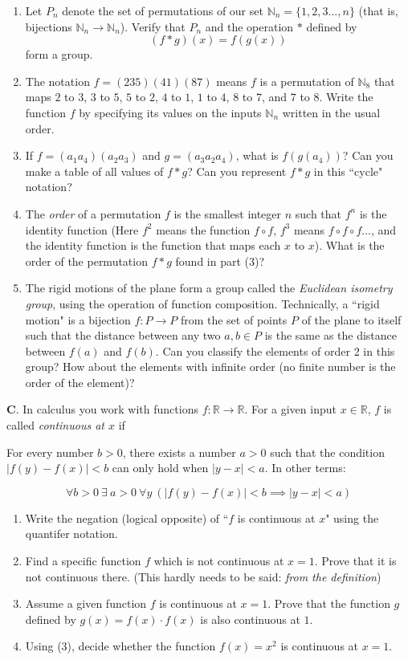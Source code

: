\documentclass[12pt]{article}
\begin{document}
\begin{enumerate}
\item{Let $P_n$ denote the set of permutations of our set $\mathbb{N}_n=\{1,2,3...,n\}$ (that is, bijections $\mathbb{N}_n\rightarrow\mathbb{N}_n$).  Verify that $P_n$ and the operation $*$ defined by 
\[(f*g)(x)=f(g(x))\]
form a group.
}
\item{The notation $f=(235)(41)(87)$ means $f$ is a permutation of $\mathbb{N}_8$ that maps $2$ to $3$, $3$ to $5$, $5$ to $2$, $4$ to $1$, $1$ to $4$, $8$ to $7$, and $7$ to $8$.  Write the function $f$ by specifying its values on the inputs $\mathbb{N}_n$ written in the usual order.}
\item{If $f=(a_1 a_4)(a_2 a_3)$ and $g=(a_3a_2a_4)$, what is $f(g(a_4))$?  Can you make a table of all values of $f*g$?  Can you represent $f*g$ in this ``cycle" notation?}
\item{The \emph{order} of a permutation $f$ is the smallest integer $n$ such that $f^{n}$ is the identity function (Here $f^{2}$ means the function $f\circ f$, $f^{3}$ means $f\circ f \circ f$..., and the identity function is the function that maps each $x$ to $x$).  What is the order of the permutation $f*g$ found in part (3)?}
\item{The rigid motions of the plane form a group called the \emph{Euclidean isometry group}, using the operation of function composition.  Technically, a ``rigid motion" is a bijection $f:P\rightarrow P$ from the set of points $P$ of the plane to itself such that the distance between any two $a,b\in P$ is the same as the distance between $f(a)$ and $f(b)$. Can you classify the elements of order 2 in this group?  How about the elements with infinite order (no finite number is the order of the element)?}
\end{enumerate}

\textbf{C}.  In calculus you work with functions $f:\mathbb{R}\rightarrow\mathbb{R}$.  For a given input $x\in\mathbb{R}$, $f$ is called \emph{continuous at $x$} if

\vspace{1pc}
For every number $b>0$, there exists a number $a>0$ such that the condition $|f(y)-f(x)|<b$ can only hold when $|y-x|<a$.  In other terms: 

\[\forall b>0  \: \exists \: a>0 \: \forall y \: (|f(y)-f(x)|<b \implies |y-x|<a)\]

\begin{enumerate}
\item{Write the negation (logical opposite) of ``$f$ is continuous at $x$" using the quantifer notation.}
\item{Find a specific function $f$ which is not continuous at $x=1$.  Prove that it is not continuous there. (This hardly needs to be said: \emph{from the definition})}
\item{Assume a given function $f$ is continuous at $x=1$.  Prove that the function $g$ defined by $g(x)=f(x)\cdot f(x)$ is also continuous at $1$.}
\item{Using (3), decide whether the function $f(x)=x^{2}$ is continuous at $x=1$.}
\end{enumerate}
\end{document}
